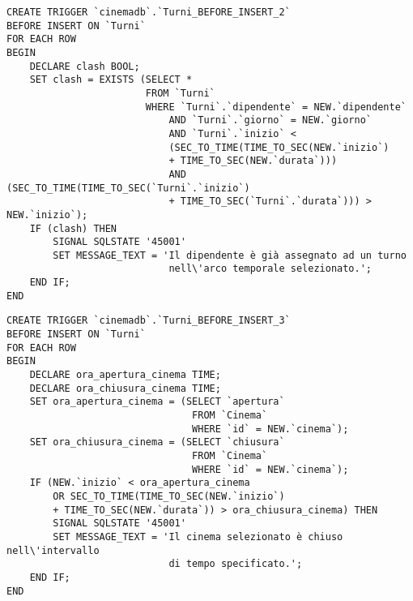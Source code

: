\pagebreak
\begin{verbatim}
CREATE TRIGGER `cinemadb`.`Turni_BEFORE_INSERT_2`
BEFORE INSERT ON `Turni`
FOR EACH ROW
BEGIN
    DECLARE clash BOOL;
    SET clash = EXISTS (SELECT * 
                        FROM `Turni` 
                        WHERE `Turni`.`dipendente` = NEW.`dipendente`
                            AND `Turni`.`giorno` = NEW.`giorno`
                            AND `Turni`.`inizio` < 
                            (SEC_TO_TIME(TIME_TO_SEC(NEW.`inizio`) 
                            + TIME_TO_SEC(NEW.`durata`))) 
                            AND (SEC_TO_TIME(TIME_TO_SEC(`Turni`.`inizio`) 
                            + TIME_TO_SEC(`Turni`.`durata`))) > NEW.`inizio`);
    IF (clash) THEN
        SIGNAL SQLSTATE '45001'
        SET MESSAGE_TEXT = 'Il dipendente è già assegnato ad un turno
                            nell\'arco temporale selezionato.';
    END IF;
END
\end{verbatim}

\begin{verbatim}
CREATE TRIGGER `cinemadb`.`Turni_BEFORE_INSERT_3`
BEFORE INSERT ON `Turni`
FOR EACH ROW
BEGIN
    DECLARE ora_apertura_cinema TIME;
    DECLARE ora_chiusura_cinema TIME;
    SET ora_apertura_cinema = (SELECT `apertura`
                                FROM `Cinema`
                                WHERE `id` = NEW.`cinema`);
    SET ora_chiusura_cinema = (SELECT `chiusura`
                                FROM `Cinema`
                                WHERE `id` = NEW.`cinema`);
    IF (NEW.`inizio` < ora_apertura_cinema
        OR SEC_TO_TIME(TIME_TO_SEC(NEW.`inizio`)
        + TIME_TO_SEC(NEW.`durata`)) > ora_chiusura_cinema) THEN
        SIGNAL SQLSTATE '45001'
        SET MESSAGE_TEXT = 'Il cinema selezionato è chiuso nell\'intervallo
                            di tempo specificato.';
    END IF;
END
\end{verbatim}

